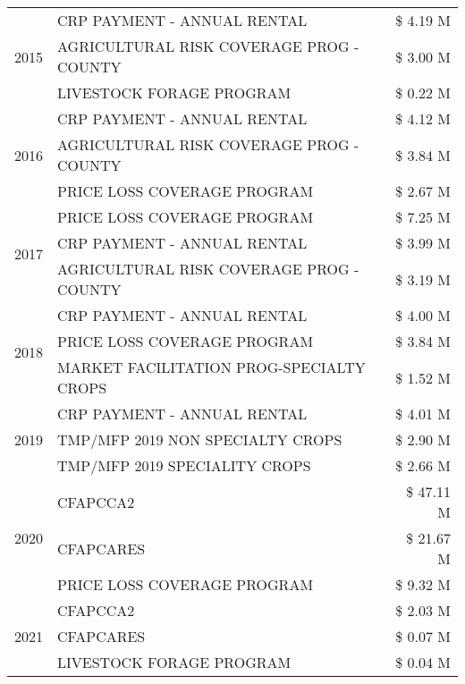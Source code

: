 \begin{tabular}{llr}
\cline{1-3}
\multirow[t]{3}{*}{2015} & CRP PAYMENT - ANNUAL RENTAL & \$ 4.19 M \\
 & AGRICULTURAL RISK COVERAGE PROG - COUNTY & \$ 3.00 M \\
 & LIVESTOCK FORAGE PROGRAM & \$ 0.22 M \\
\cline{1-3}
\multirow[t]{3}{*}{2016} & CRP PAYMENT - ANNUAL RENTAL & \$ 4.12 M \\
 & AGRICULTURAL RISK COVERAGE PROG - COUNTY & \$ 3.84 M \\
 & PRICE LOSS COVERAGE PROGRAM & \$ 2.67 M \\
\cline{1-3}
\multirow[t]{3}{*}{2017} & PRICE LOSS COVERAGE PROGRAM & \$ 7.25 M \\
 & CRP PAYMENT - ANNUAL RENTAL & \$ 3.99 M \\
 & AGRICULTURAL RISK COVERAGE PROG - COUNTY & \$ 3.19 M \\
\cline{1-3}
\multirow[t]{3}{*}{2018} & CRP PAYMENT - ANNUAL RENTAL & \$ 4.00 M \\
 & PRICE LOSS COVERAGE PROGRAM & \$ 3.84 M \\
 & MARKET FACILITATION PROG-SPECIALTY CROPS & \$ 1.52 M \\
\cline{1-3}
\multirow[t]{3}{*}{2019} & CRP PAYMENT - ANNUAL RENTAL & \$ 4.01 M \\
 & TMP/MFP 2019 NON SPECIALTY CROPS & \$ 2.90 M \\
 & TMP/MFP 2019 SPECIALITY CROPS & \$ 2.66 M \\
\cline{1-3}
\multirow[t]{3}{*}{2020} & CFAPCCA2 & \$ 47.11 M \\
 & CFAPCARES & \$ 21.67 M \\
 & PRICE LOSS COVERAGE PROGRAM & \$ 9.32 M \\
\cline{1-3}
\multirow[t]{3}{*}{2021} & CFAPCCA2 & \$ 2.03 M \\
 & CFAPCARES & \$ 0.07 M \\
 & LIVESTOCK FORAGE PROGRAM & \$ 0.04 M \\
\cline{1-3}
\bottomrule
\end{tabular}
